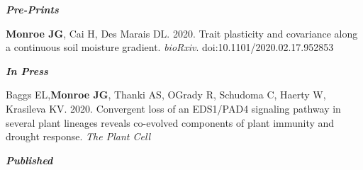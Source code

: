 \documentclass[12pt,english]{article}
\begin{document}
\begin{hangparas}{.5in}{1}

\textbf{\textit{Pre-Prints}}\par
\hspace{1em} \textbf{Monroe JG}, Cai H, Des Marais DL. 2020. Trait plasticity and covariance along a continuous soil moisture gradient. \textit{bioRxiv}. doi:10.1101/2020.02.17.952853

\textbf{\textit{In Press}}\par
\hspace{1em} Baggs EL,\textbf{Monroe JG}, Thanki AS, OGrady R, Schudoma C, Haerty W, Krasileva KV. 2020. Convergent loss of an EDS1/PAD4 signaling pathway in several plant lineages reveals co-evolved components of plant immunity and drought response. \textit{The Plant Cell}

\textbf{\textit{Published}}\par


\end{hangparas}
\end{document}

